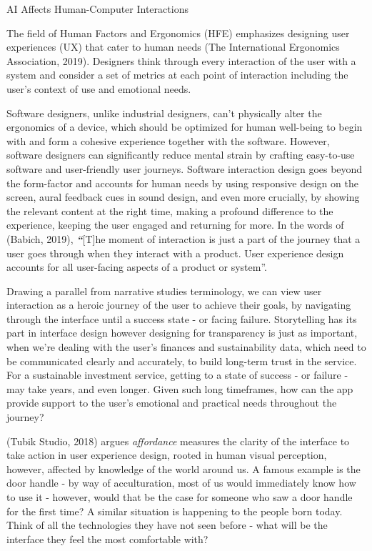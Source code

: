 \documentclass[
  letterpaper,
  DIV=11,
  numbers=noendperiod]{scrartcl}
\begin{document}
AI Affects Human-Computer Interactions

The field of Human Factors and Ergonomics (HFE) emphasizes designing
user experiences (UX) that cater to human needs (The International
Ergonomics Association, 2019). Designers think through every interaction
of the user with a system and consider a set of metrics at each point of
interaction including the user's context of use and emotional needs.

Software designers, unlike industrial designers, can't physically alter
the ergonomics of a device, which should be optimized for human
well-being to begin with and form a cohesive experience together with
the software. However, software designers can significantly reduce
mental strain by crafting easy-to-use software and user-friendly user
journeys. Software interaction design goes beyond the form-factor and
accounts for human needs by using responsive design on the screen, aural
feedback cues in sound design, and even more crucially, by showing the
relevant content at the right time, making a profound difference to the
experience, keeping the user engaged and returning for more. In the
words of (Babich, 2019), \textbf{\emph{``}}{[}T{]}he moment of
interaction is just a part of the journey that a user goes through when
they interact with a product. User experience design accounts for all
user-facing aspects of a product or system''.

Drawing a parallel from narrative studies terminology, we can view user
interaction as a heroic journey of the user to achieve their goals, by
navigating through the interface until a success state - or facing
failure. Storytelling has its part in interface design however designing
for transparency is just as important, when we're dealing with the
user's finances and sustainability data, which need to be communicated
clearly and accurately, to build long-term trust in the service. For a
sustainable investment service, getting to a state of success - or
failure - may take years, and even longer. Given such long timeframes,
how can the app provide support to the user's emotional and practical
needs throughout the journey?

(Tubik Studio, 2018) argues \emph{affordance} measures the clarity of
the interface to take action in user experience design, rooted in human
visual perception, however, affected by knowledge of the world around
us. A famous example is the door handle - by way of acculturation, most
of us would immediately know how to use it - however, would that be the
case for someone who saw a door handle for the first time? A similar
situation is happening to the people born today. Think of all the
technologies they have not seen before - what will be the interface they
feel the most comfortable with?
\end{document}
